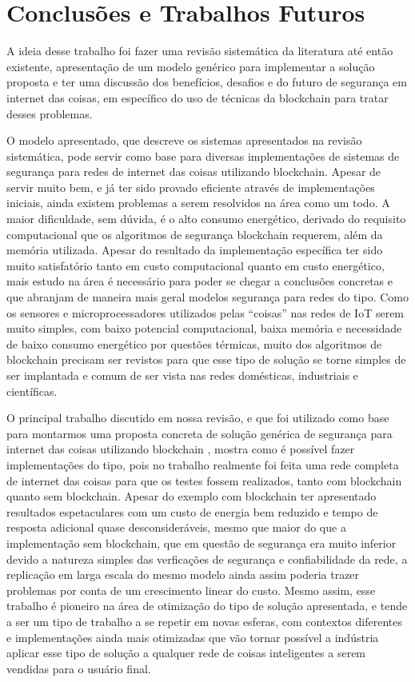 \section{Conclusões e Trabalhos Futuros}

A ideia desse trabalho foi fazer uma revisão sistemática da literatura até então existente, apresentação de um modelo genérico para implementar a solução proposta e ter uma discussão dos benefícios, desafios e do futuro de segurança em internet das coisas, em específico do uso de técnicas da blockchain para tratar desses problemas. 

O modelo apresentado, que descreve os sistemas apresentados na revisão sistemática, pode servir como base para diversas implementações de sistemas de segurança para redes de internet das coisas utilizando blockchain. Apesar de servir muito bem, e já ter sido provado eficiente através de implementações iniciais, ainda existem problemas a serem resolvidos na área como um todo. A maior dificuldade, sem dúvida, é o alto consumo energético, derivado do requisito computacional que os algoritmos de segurança blockchain requerem, além da memória utilizada. Apesar do resultado da implementação específica ter sido muito satisfatório tanto em custo computacional quanto em custo energético, mais estudo na área é necessário para poder se chegar a conclusões concretas e que abranjam de maneira mais geral modelos segurança para redes do tipo. Como os sensores e microprocessadores utilizados pelas ``coisas'' nas redes de IoT serem muito simples, com baixo potencial computacional, baixa memória e necessidade de baixo consumo energético por questões térmicas, muito dos algoritmos de blockchain precisam ser revistos para que esse tipo de solução se torne simples de ser implantada e comum de ser vista nas redes domésticas, industriais e científicas.

O principal trabalho discutido em nossa revisão, e que foi utilizado como base para montarmos uma proposta concreta de solução genérica de segurança para internet das coisas utilizando blockchain \cite{dorri2017blockchain}, mostra como é possível fazer implementações do tipo, pois no trabalho realmente foi feita uma rede completa de internet das coisas para que os testes fossem realizados, tanto com blockchain quanto sem blockchain. Apesar do exemplo com blockchain ter apresentado resultados espetaculares com um custo de energia bem reduzido e tempo de resposta adicional quase desconsideráveis, mesmo que maior do que a implementação sem blockchain, que em questão de segurança era muito inferior devido a natureza simples das verficações de segurança e confiabilidade da rede, a replicação em larga escala do mesmo modelo ainda assim poderia trazer problemas por conta de um crescimento linear do custo. Mesmo assim, esse trabalho é pioneiro na área de otimização do tipo de solução apresentada, e tende a ser um tipo de trabalho a se repetir em novas esferas, com contextos diferentes e implementações ainda mais otimizadas que vão tornar possível a indústria aplicar esse tipo de solução a qualquer rede de coisas inteligentes a serem vendidas para o usuário final.

